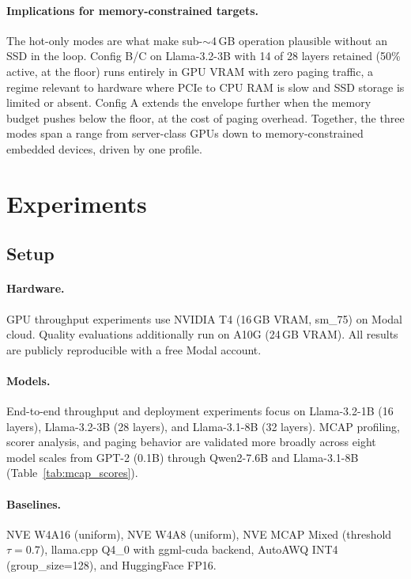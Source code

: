 \documentclass{article}
\begin{document}
\paragraph{Implications for memory-constrained targets.} The hot-only modes
are what make sub-$\sim$4\,GB operation plausible without an SSD in the loop.
Config B/C on Llama-3.2-3B with 14 of 28 layers retained (50\% active, at the
floor) runs entirely in GPU VRAM with zero paging traffic, a regime relevant to
hardware where PCIe to CPU RAM is slow and SSD storage is limited or absent.
Config A extends the envelope further when the memory budget pushes below the
floor, at the cost of paging overhead. Together, the three modes span a range
from server-class GPUs down to memory-constrained embedded devices, driven by
one profile.


\section{Experiments}
\label{sec:experiments}

\subsection{Setup}

\paragraph{Hardware.} GPU throughput experiments use NVIDIA T4 (16\,GB VRAM, sm\_75) on
Modal cloud. Quality evaluations additionally run on A10G (24\,GB VRAM). All results are
publicly reproducible with a free Modal account.

\paragraph{Models.} End-to-end throughput and deployment experiments focus on
Llama-3.2-1B (16 layers), Llama-3.2-3B (28 layers), and Llama-3.1-8B (32 layers). MCAP
profiling, scorer analysis, and paging behavior are validated more broadly across eight
model scales from GPT-2 (0.1B) through Qwen2-7.6B and Llama-3.1-8B
(Table~\ref{tab:mcap_scores}).

\paragraph{Baselines.} NVE W4A16 (uniform), NVE W4A8 (uniform), NVE MCAP Mixed
(threshold $\tau = 0.7$), llama.cpp Q4\_0 with ggml-cuda backend, AutoAWQ INT4
(group\_size=128), and HuggingFace FP16.
\end{document}
